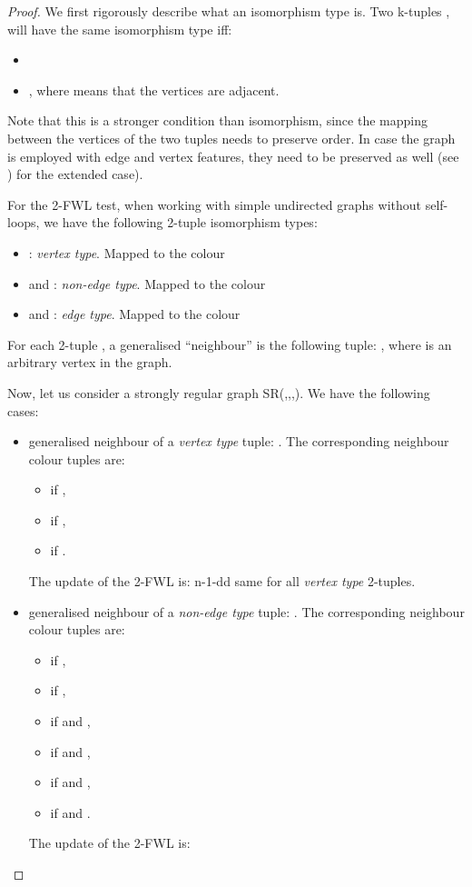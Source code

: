 \documentclass{article} \usepackage{iclr2021_conference,times}
\begin{document}
\begin{proof}

 We first rigorously describe what an isomorphism type is. Two k-tuples , 
 will have the same isomorphism type iff:

\begin{itemize}
    \item  
    \item  , where  means that the vertices are adjacent.
\end{itemize}

Note that this is a stronger condition than isomorphism, since the mapping between the vertices of the two tuples needs to preserve order. In case the graph is employed with edge and vertex features, they need to be preserved as well (see \cite{chen2020can}) for the extended case). 

For the 2-FWL test, when working with simple undirected graphs without self-loops, we have the following 2-tuple isomorphism types:
\begin{itemize}
    \item : \textit{vertex type}. Mapped to the colour 
    \item  and :\textit{ non-edge type}. Mapped to the colour 
    \item  and : \textit{edge type}. Mapped to the colour 
\end{itemize}
 
 For each 2-tuple , a generalised ``neighbour'' is the following tuple: , where  is an arbitrary vertex in the graph. 

Now, let us consider a strongly regular graph SR(,,,). We have the following cases:

\begin{itemize}
    \item generalised neighbour of a  \textit{vertex type} tuple: . The corresponding neighbour colour tuples are:
    \begin{itemize}
        \item   if  ,
        \item  if  ,
        \item  if .
    \end{itemize}
    The update of the 2-FWL is: n-1-dd same for all \textit{vertex type} 2-tuples.
    
    \item generalised neighbour of a \textit{non-edge type} tuple: . The corresponding neighbour colour tuples are:
    \begin{itemize}
        \item  if ,  
        \item  if , 
        \item  if  and , 
        \item  if  and , 
        \item  if  and , 
        \item  if  and .
    \end{itemize}
     The update of the 2-FWL is:
     

\end{itemize}
\end{proof}
\end{document}
